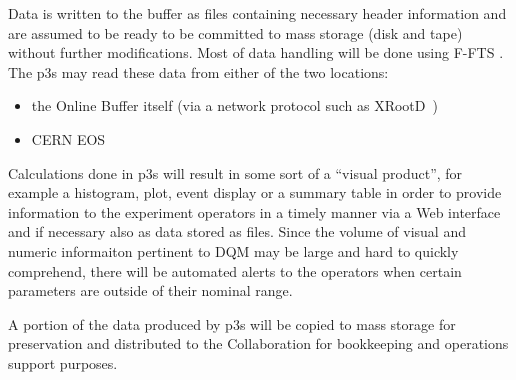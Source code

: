 \documentclass[pdftex,12pt,letter]{article}
\begin{document}
Data is written to the buffer as files containing
necessary header information and are assumed to be ready to be committed to mass
storage (disk and tape) without further modifications. Most of data handling will
be done using F-FTS \cite{docdb1212,fts}. The p3s may read these data from
either of the two locations:
\begin{itemize}
\item the Online Buffer itself (via a network protocol such as XRootD~\cite{xrootd})
\item CERN EOS~\cite{eos}
\end{itemize}

\noindent Calculations done in p3s 
will result in some sort of a ``visual product'', for example a histogram, plot, event display
or a summary table in order to provide information to the experiment operators in a timely manner
via a Web interface and if necessary also as data stored as files. 
Since the volume of visual and numeric informaiton pertinent to DQM may be large and hard
to quickly comprehend, there will be automated alerts to the operators when certain parameters
are outside of their nominal range.

A portion of the data produced by p3s will
be copied to mass storage for preservation and distributed to the Collaboration for
bookkeeping and operations support purposes.
\end{document}
